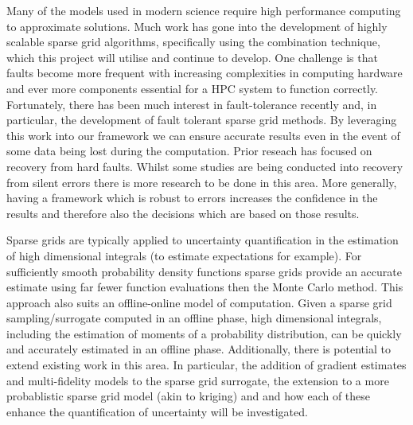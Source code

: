 \documentclass[a4paper,fontsize=12pt]{scrartcl}
\begin{document}
Many of the models used in modern science require high performance computing
to approximate solutions. Much work has gone into the development 
of highly scalable sparse grid algorithms, specifically using the combination 
technique, which this project will utilise and continue to develop. 
One challenge is that faults become more frequent with increasing 
complexities in computing hardware and ever more components essential 
for a HPC system to function correctly. Fortunately, there has been much interest in 
fault-tolerance recently and, in particular, the development of fault tolerant 
sparse grid methods. By leveraging this work into our framework we can ensure
accurate results even in the event of some data being lost during the computation.
Prior reseach has focused on recovery from hard faults. Whilst some studies are
being conducted into recovery from silent errors there is more research to be done in this area.
More generally, having a framework which is robust to errors increases the confidence 
in the results and therefore also the decisions which are based on those results.

Sparse grids are typically applied to uncertainty quantification in the
estimation of high dimensional integrals (to estimate expectations for example). 
For sufficiently smooth probability density functions sparse grids provide
an accurate estimate using far fewer function evaluations then the Monte Carlo 
method.
This approach also suits an offline-online model of computation.
Given a sparse grid sampling/surrogate computed in an offline phase, high 
dimensional integrals, including the estimation of moments of a probability distribution,
can be quickly and accurately estimated in an offline phase.
Additionally, there is potential to extend existing work in this area. 
In particular, the addition of gradient estimates and multi-fidelity models 
to the sparse grid surrogate, 
the extension to a more probablistic sparse grid model (akin to kriging) and
and how each of these enhance the quantification of uncertainty will be investigated.

\end{document}
